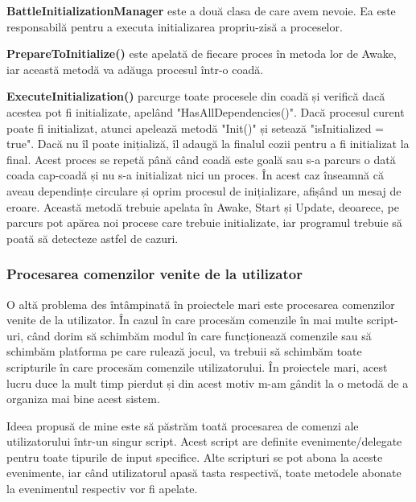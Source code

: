 \documentclass[12pt, a4paper]{article}
\begin{document}
	\textbf{BattleInitializationManager} este a două clasa de care avem nevoie. Ea este responsabilă pentru a executa initializarea propriu-zisă a proceselor. 
	\newline
	
	\textbf{PrepareToInitialize()} este apelată de fiecare proces în metoda lor de Awake, iar această metodă va adăuga procesul într-o coadă.
	\newline
	
	\textbf{ExecuteInitialization()} parcurge toate procesele din coadă și verifică dacă acestea pot fi initializate, apelând "HasAllDependencies()". Dacă procesul curent poate fi initializat, atunci apelează metodă "Init()" și setează "isInitialized = true". Dacă nu îl poate inițializă, îl adaugă la finalul cozii pentru a fi initializat la final. Acest proces se repetă până când coadă este goală sau s-a parcurs o dată coada cap-coadă și nu s-a initializat nici un proces. În acest caz înseamnă că aveau dependințe circulare și oprim procesul de inițializare, afișând un mesaj de eroare. Această metodă trebuie apelata în Awake, Start și Update, deoarece, pe parcurs pot apărea noi procese care trebuie initializate, iar programul trebuie să poată să detecteze astfel de cazuri.
	
	
	
	
	
	\subsubsection{Procesarea comenzilor venite de la utilizator}
	
	O altă problema des întâmpinată în proiectele mari este procesarea comenzilor venite de la utilizator. În cazul în care procesăm comenzile în mai multe script-uri, când dorim să schimbăm modul în care funcționează comenzile sau să schimbăm platforma pe care rulează jocul, va trebuii să schimbăm toate scripturile în care procesăm comenzile utilizatorului. În proiectele mari, acest lucru duce la mult timp pierdut și din acest motiv m-am gândit la o metodă de a organiza mai bine acest sistem.
	\newline
	
	Ideea propusă de mine este să păstrăm toată procesarea de comenzi ale utilizatorului într-un singur script. Acest script are definite evenimente/delegate pentru toate tipurile de input specifice. Alte scripturi se pot abona la aceste evenimente, iar când utilizatorul apasă tasta respectivă, toate metodele abonate la evenimentul respectiv vor fi apelate.
	\newline
	
\end{document}
